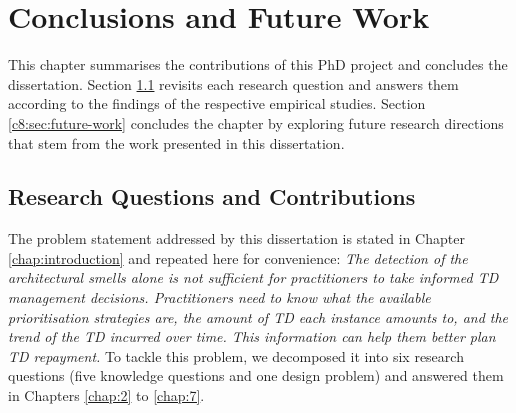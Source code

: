 \setlength{\headheight}{1.2cm}
\renewcommand{\publ}{\flushleft\footnotesize{}}

\chapter{Conclusions and Future Work}\label{chap:8}
This chapter summarises the contributions of this PhD project and concludes the dissertation.
Section \ref{c8:sec:rq-contributions} revisits each research question and answers them according to the findings of the respective empirical studies.
Section \ref{c8:sec:future-work} concludes the chapter by exploring future research directions that stem from the work presented in this dissertation.

\section{Research Questions and Contributions}\label{c8:sec:rq-contributions}
The problem statement addressed by this dissertation is stated in Chapter \ref{chap:introduction} and repeated here for convenience: \textit{The detection of the architectural smells alone is not sufficient for practitioners to take informed TD management decisions. Practitioners need to know what the available prioritisation strategies are, the amount of TD each instance amounts to, and the trend of the TD incurred over time. This information can help them better plan TD repayment.}
To tackle this problem, we decomposed it into six research questions (five knowledge questions and one design problem) and answered them in Chapters \ref{chap:2} to \ref{chap:7}.

